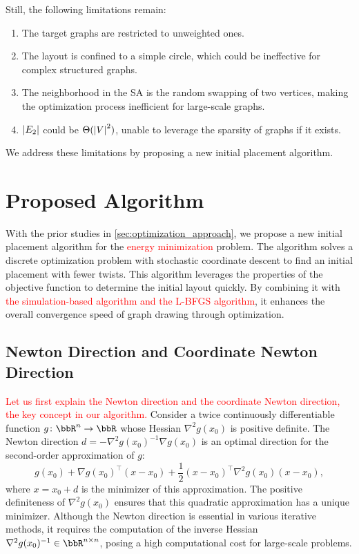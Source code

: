 \documentclass[11pt]{article}
\newcommand{\red}[1]{\textcolor{red}{#1}}
\begin{document}
Still, the following limitations remain:
\begin{enumerate}[label=\textbullet, itemsep=0pt, parsep=0pt]
  \item The target graphs are restricted to unweighted ones.

  \item The layout is confined to a simple circle, which could be ineffective for complex structured graphs.

  \item The neighborhood in the SA is the random swapping of two vertices, making the optimization process inefficient for large-scale graphs.

  \item $\abs{E_2}$ could be $\Theta(\abs{V}^{2})$, unable to leverage the sparsity of graphs if it exists.
\end{enumerate}
We address these limitations by proposing a new initial placement algorithm.

\section{Proposed Algorithm}
\label{sec:algorithm}

With the prior studies in \cref{sec:optimization_approach}, we propose a new initial placement algorithm for the \red{energy minimization} problem.
The algorithm solves a discrete optimization problem with stochastic coordinate descent to find an initial placement with fewer twists.
This algorithm leverages the properties of the objective function to determine the initial layout quickly.
By combining it with \red{the simulation-based algorithm and the L-BFGS algorithm}, it enhances the overall convergence speed of graph drawing through optimization.

\subsection{Newton Direction and Coordinate Newton Direction}
\label{ssec:introNewton}

\red{Let us first explain the Newton direction and the coordinate Newton direction, the key concept in our algorithm.}
Consider a twice continuously differentiable function $g \colon \bbR^{n} \to \bbR$ whose Hessian $\nabla^{2}g(x_{0})$ is positive definite.
The Newton direction $d = -\nabla^{2}g(x_{0})^{-1}\nabla g(x_{0})$ is an optimal direction for the second-order approximation of $g$:
\begin{equation*}
  g(x_{0}) + \nabla g(x_{0})^{\top}(x - x_{0}) + \frac{1}{2}(x - x_{0})^{\top}\nabla
  ^{2}g(x_{0}) (x - x_{0}),
\end{equation*}
where $x = x_{0}+ d$ is the minimizer of this approximation.
The positive definiteness of $\nabla^{2}g(x_{0})$ ensures that this quadratic approximation has a unique minimizer.
Although the Newton direction is essential in various iterative methods, it requires the computation of the inverse Hessian $\nabla^{2}g(x_{0})^{-1}\in \bbR^{n \times n}$, posing a high computational cost for large-scale problems.
\end{document}
